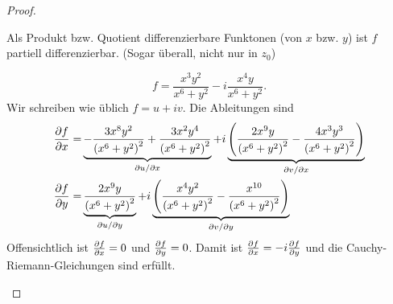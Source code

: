 \begin{proof}
	\begin{parts}
	\item Als Produkt bzw. Quotient differenzierbare Funktonen (von $x$ bzw. $y$) ist $f$ partiell differenzierbar. (Sogar überall, nicht nur in $z_0$)
	\item 
		\[
		f=\frac{x^3 y^2}{x^6 + y^2}-i \frac{x^4 y}{x^6 + y^2}
		.\] 
		Wir schreiben wie üblich $f=u+iv$. Die Ableitungen sind
		\begin{align*}
			\pdv{f}{x}=&\underbrace{-\frac{3 x^8 y^2}{\left(x^6+y^2\right)^2}+\frac{3 x^2 y^4}{\left(x^6+y^2\right)^2}}_{\partial u / \partial x}+i \underbrace{\left(\frac{2 x^9 y}{\left(x^6+y^2\right)^2}-\frac{4 x^3 y^3}{\left(x^6+y^2\right)^2}\right)}_{\partial v/\partial x}\\
			\pdv{f}{y} =& \underbrace{\frac{2 x^9 y}{\left(x^6+y^2\right)^2}}_{\partial u / \partial y}+i\underbrace{\left(\frac{x^4 y^2}{\left(x^6+y^2\right)^2}-\frac{x^{10}}{\left(x^6+y^2\right)^2}\right)}_{\partial v/\partial y}
		\end{align*}
		Offensichtlich ist $\pdv{f}{x}(0)=0$ und $\pdv{f}{y}(0)=0$. Damit ist $\pdv{f}{x}(0)=-i\pdv{f}{y}(0)$ und die Cauchy-Riemann-Gleichungen sind erfüllt.
		\item 
	\end{parts}
\end{proof}

